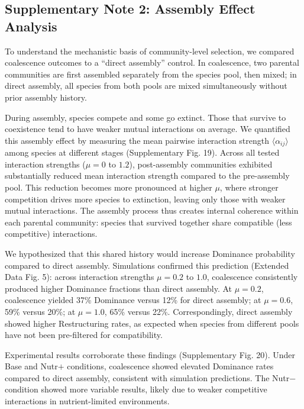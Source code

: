 \subsection*{Supplementary Note 2: Assembly Effect Analysis}
\label{sec:suppl:note2}

To understand the mechanistic basis of community-level selection, we compared coalescence outcomes to a ``direct assembly'' control. In coalescence, two parental communities are first assembled separately from the species pool, then mixed; in direct assembly, all species from both pools are mixed simultaneously without prior assembly history.

During assembly, species compete and some go extinct. Those that survive to coexistence tend to have weaker mutual interactions on average. We quantified this assembly effect by measuring the mean pairwise interaction strength $\langle \alpha_{ij} \rangle$ among species at different stages (Supplementary Fig. 19). Across all tested interaction strengths ($\mu = 0$ to $1.2$), post-assembly communities exhibited substantially reduced mean interaction strength compared to the pre-assembly pool. This reduction becomes more pronounced at higher $\mu$, where stronger competition drives more species to extinction, leaving only those with weaker mutual interactions. The assembly process thus creates internal coherence within each parental community: species that survived together share compatible (less competitive) interactions.

We hypothesized that this shared history would increase Dominance probability compared to direct assembly. Simulations confirmed this prediction (Extended Data Fig. 5): across interaction strengths $\mu = 0.2$ to $1.0$, coalescence consistently produced higher Dominance fractions than direct assembly. At $\mu = 0.2$, coalescence yielded 37\% Dominance versus 12\% for direct assembly; at $\mu = 0.6$, 59\% versus 20\%; at $\mu = 1.0$, 65\% versus 22\%. Correspondingly, direct assembly showed higher Restructuring rates, as expected when species from different pools have not been pre-filtered for compatibility.

Experimental results corroborate these findings (Supplementary Fig. 20). Under Base and Nutr$+$ conditions, coalescence showed elevated Dominance rates compared to direct assembly, consistent with simulation predictions. The Nutr$-$ condition showed more variable results, likely due to weaker competitive interactions in nutrient-limited environments.

